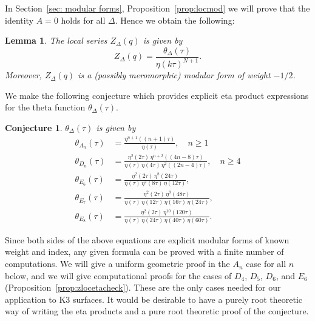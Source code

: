 \documentclass{article}
\newtheorem{conjecture}[theorem]{Conjecture}
\newtheorem{lemma}[theorem]{Lemma}
\theoremstyle{definition}
\begin{document}
In Section~\ref{sec: modular forms}, Proposition~\ref{prop:locmod} we will prove that the identity $A=0$ holds
for all $\Delta$. Hence we obtain the following:
\begin{lemma}\label{lem: local series as theta/eta} The local series
$Z_{\Delta}(q)$ is given by
\[
Z_{\Delta}(q) = \frac{\theta_{\Delta}(\tau )}{\eta (k\tau )^{N+1}}. 
\]
Moreover, $Z_{\Delta}(q)$  is a (possibly meromorphic) modular form of weight $-1/2$.
\end{lemma}
We make the following conjecture which provides explicit eta product expressions for the theta function $\theta_{\Delta}(\tau )$.

\begin{conjecture}\label{conj: eta product for theta function}
$\theta_{\Delta}(\tau )$ is given by
\begin{align}\label{eqn: theta function eta products}
\theta_{A_{n}}(\tau ) &= \frac{\eta^{n+1}((n+1)\tau )}{\eta (\tau )} ,\quad n\geq 1\\
\theta_{D_{n}}(\tau ) &= \frac{\eta^{2}(2\tau )\,  \eta^{n+2}((4n-8)\tau )}{\eta (\tau )\,  \eta (4\tau )\,  \eta^{2}((2n-4)\tau )} ,\quad n\geq 4\\
\theta_{E_{6}}(\tau ) & = \frac{\eta^{2}(2\tau )\, \eta^{8}(24\tau
)}{\eta (\tau )\, \eta^{2}(8\tau )\, \eta (12\tau )} ,\\
\theta_{E_{7}}(\tau ) & = \frac{\eta^{2}(2\tau )\, \eta^{9}(48\tau
)}{\eta (\tau )\, \eta(12\tau )\, \eta(16\tau )\, \eta (24\tau )} ,\\
\theta_{E_{8}}(\tau ) & = \frac{\eta^{2}(2\tau )\, \eta^{10}(120\tau
)}{\eta (\tau )\, \eta(24\tau )\, \eta(40\tau )\, \eta (60\tau )}.
\end{align}
\end{conjecture}

Since both sides of the above equations are explicit modular forms of known
weight and index, any given formula can be proved with a finite number
of computations. We will give a uniform geometric proof in the $A_{n}$ case for
all $n$ below, and we will give computational proofs for the cases of
$D_{4}$, $D_{5}$, $D_{6}$, and $E_{6}$ (Proposition~\ref{prop:zlocetacheck}). These are the only cases needed for our application to K3 surfaces. It would be desirable to have a
purely root theoretic way of writing the eta products and a pure root
theoretic proof of the conjecture. 
\end{document}
